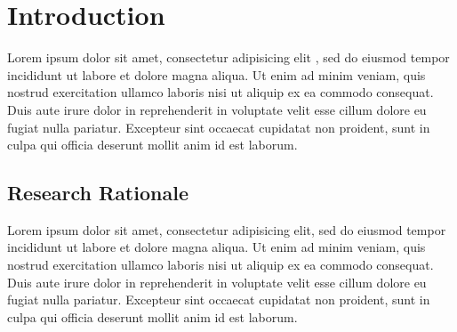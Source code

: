 
\chapter{Introduction}
\label{chap:intro}
Lorem ipsum dolor sit amet, consectetur adipisicing elit \citep{UbuntuSecurity}, sed do eiusmod tempor incididunt ut labore et dolore magna aliqua. 
Ut enim ad minim veniam, quis nostrud exercitation ullamco laboris nisi ut aliquip ex ea commodo consequat. 
Duis aute irure dolor in reprehenderit in voluptate velit esse cillum dolore eu fugiat nulla pariatur. 
Excepteur sint occaecat cupidatat non proident, sunt in culpa qui officia deserunt mollit anim id est laborum.

\section{Research Rationale}
Lorem ipsum dolor sit amet, consectetur adipisicing elit, sed do eiusmod tempor incididunt ut labore et dolore magna aliqua. 
Ut enim ad minim veniam, quis nostrud exercitation ullamco laboris nisi ut aliquip ex ea commodo consequat. 
Duis aute irure dolor in reprehenderit in voluptate velit esse cillum dolore eu fugiat nulla pariatur. 
Excepteur sint occaecat cupidatat non proident, sunt in culpa qui officia deserunt mollit anim id est laborum.
